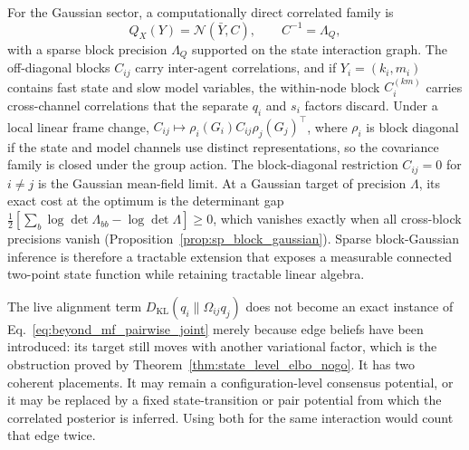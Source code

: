 For the Gaussian sector, a computationally direct correlated family is
\begin{equation}
Q_X(Y)=\mathcal{N}(\bar{Y},C),
\qquad
C^{-1}=\Lambda_Q,
\label{eq:beyond_mf_block_gaussian}
\end{equation}
with a sparse block precision $\Lambda_Q$ supported on the state interaction graph. The off-diagonal blocks $C_{ij}$ carry inter-agent correlations, and if $Y_i=(k_i,m_i)$ contains fast state and slow model variables, the within-node block $C_i^{(km)}$ carries cross-channel correlations that the separate $q_i$ and $s_i$ factors discard. Under a local linear frame change, $C_{ij}\mapsto \rho_i(G_i)C_{ij}\rho_j(G_j)^\top$, where $\rho_i$ is block diagonal if the state and model channels use distinct representations, so the covariance family is closed under the group action. The block-diagonal restriction $C_{ij}=0$ for $i\ne j$ is the Gaussian mean-field limit. At a Gaussian target of precision $\Lambda$, its exact cost at the optimum is the determinant gap $\frac12[\sum_b\log\det\Lambda_{bb}-\log\det\Lambda]\ge0$, which vanishes exactly when all cross-block precisions vanish (Proposition~\ref{prop:sp_block_gaussian}). Sparse block-Gaussian inference is therefore a tractable extension that exposes a measurable connected two-point state function while retaining tractable linear algebra.

The live alignment term $D_{\mathrm{KL}}(q_i\|\Omega_{ij}q_j)$ does not become an exact instance of Eq.~\eqref{eq:beyond_mf_pairwise_joint} merely because edge beliefs have been introduced: its target still moves with another variational factor, which is the obstruction proved by Theorem~\ref{thm:state_level_elbo_nogo}. It has two coherent placements. It may remain a configuration-level consensus potential, or it may be replaced by a fixed state-transition or pair potential from which the correlated posterior is inferred. Using both for the same interaction would count that edge twice.


